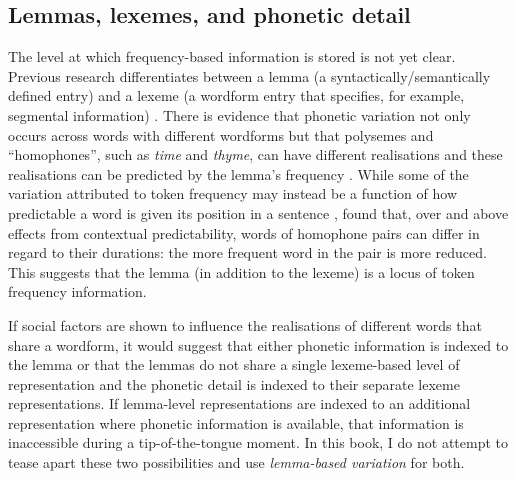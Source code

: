 

	\subsection{Lemmas, lexemes, and phonetic detail}
	
The level at which frequency-based information is stored is not yet clear. Previous research differentiates between a lemma (a syntactically/semantically defined entry) and a lexeme (a wordform entry that specifies, for example, segmental information) \citep{bock1995}. There is evidence that phonetic variation not only occurs across words with different wordforms but that polysemes and ``homophones'', such as \textit{time} and \textit{thyme}, can have different realisations and these realisations can be predicted by the lemma's frequency \citep{gahl-thyme,jurafskyetal2002}. While some of the variation attributed to token frequency may instead be a function of how predictable a word is given its position in a sentence \citep{jurafskyetal2002}, \citet{gahl-thyme} found that, over and above effects from contextual predictability, words of homophone pairs can differ in regard to their durations: the more frequent word in the pair is more reduced. This suggests that the lemma (in addition to the lexeme) is a locus of token frequency information. 

If social factors are shown to influence the realisations of different words that share a wordform, it would suggest that either phonetic information is indexed to the lemma or that the lemmas do not share a single lexeme-based level of representation and the phonetic detail is indexed to their separate lexeme representations. If lemma-level representations are indexed to an additional representation where phonetic information is available, that information is inaccessible during a tip-of-the-tongue moment. \nocite{johnson1997}\nocite{pierrehumbert2001}\nocite{pierrehumbert2006} In this book, I do not attempt to tease apart these two possibilities and use \textit{lemma-based variation} for both.

							

